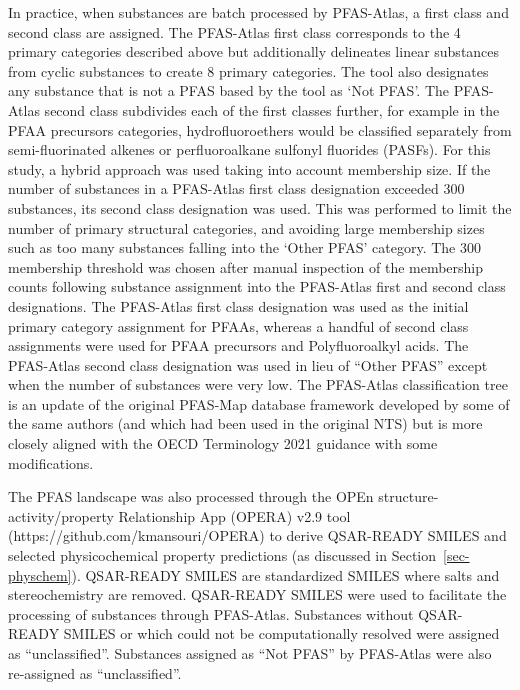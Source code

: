 \documentclass[
  super,
  preprint,
  3p]{elsarticle}
\begin{document}
In practice, when substances are batch processed by PFAS-Atlas, a first
class and second class are assigned. The PFAS-Atlas first class
corresponds to the 4 primary categories described above but additionally
delineates linear substances from cyclic substances to create 8 primary
categories. The tool also designates any substance that is not a PFAS
based by the tool as `Not PFAS'. The PFAS-Atlas second class subdivides
each of the first classes further, for example in the PFAA precursors
categories, hydrofluoroethers would be classified separately from
semi-fluorinated alkenes or perfluoroalkane sulfonyl fluorides (PASFs).
For this study, a hybrid approach was used taking into account
membership size. If the number of substances in a PFAS-Atlas first class
designation exceeded 300 substances, its second class designation was
used. This was performed to limit the number of primary structural
categories, and avoiding large membership sizes such as too many
substances falling into the `Other PFAS' category. The 300 membership
threshold was chosen after manual inspection of the membership counts
following substance assignment into the PFAS-Atlas first and second
class designations. The PFAS-Atlas first class designation was used as
the initial primary category assignment for PFAAs, whereas a handful of
second class assignments were used for PFAA precursors and
Polyfluoroalkyl acids. The PFAS-Atlas second class designation was used
in lieu of ``Other PFAS'' except when the number of substances were very
low. The PFAS-Atlas classification tree is an update of the original
PFAS-Map database framework developed by some of the same authors
\citep{su_database_2021} (and which had been used in the original NTS)
but is more closely aligned with the OECD Terminology 2021 guidance
\citep{oecd_reconciling_2021} with some modifications.

The PFAS landscape was also processed through the OPEn
structure-activity/property Relationship App (OPERA) v2.9 tool
\citep{mansouri_opera_2018} (https://github.com/kmansouri/OPERA) to
derive QSAR-READY SMILES and selected physicochemical property
predictions (as discussed in Section~\ref{sec-physchem}). QSAR-READY
SMILES are standardized SMILES where salts and stereochemistry are
removed. QSAR-READY SMILES were used to facilitate the processing of
substances through PFAS-Atlas. Substances without QSAR-READY SMILES or
which could not be computationally resolved were assigned as
``unclassified''. Substances assigned as ``Not PFAS'' by PFAS-Atlas were
also re-assigned as ``unclassified''.
\end{document}
